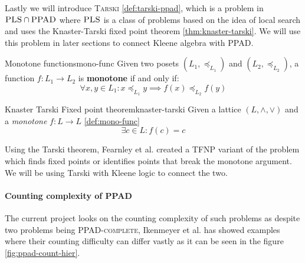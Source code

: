 Lastly we will introduce \textsc{Tarski} \ref{def:tarski-ppad}, which is a problem in $\textsc{PLS} \cap \textsc{PPAD}$
where $\textsc{PLS}$ is a class of problems based on the idea of local search \cite{johnson_HowEasyLocal_1988}
and uses the Knaster-Tarski fixed point theorem \ref{thm:knaster-tarski}. We will use this problem in later
sections to connect Kleene algebra with \textsc{PPAD}.


\begin{definitionbox}{Monotone functions}{mono-func}
    Given two posets $(L_1, \preceq_{L_1})$ and $(L_2, \preceq_{L_2})$, a function
    $f: L_1 \to L_2$ is \textbf{monotone} if and only if:
    $$
    \forall x,y \in L_1: x \preceq_{L_1} y \implies f(x) \preceq_{L_2} f(y)
    $$
\end{definitionbox}
    

\begin{theorembox}{Knaster Tarski Fixed point theorem\cite{bronislaw_TheoremeFunctionsDensembles_1928, fearnley_FasterAlgorithmFinding_2022}}{knaster-tarski}
    Given a lattice $(L, \wedge, \vee)$ and a \textit{monotone} $f: L \to L$ \ref{def:mono-func}
    $$
    \exists c \in L: f(c) = c
    $$
\end{theorembox}

Using the Tarski theorem, Fearnley et al. \cite{fearnley_FasterAlgorithmFinding_2022}
created a \textsc{TFNP} variant of the problem which finds fixed points or 
identifies points that break the monotone argument. We will be using Tarski 
with Kleene logic to connect the two.
%
\paragraph{Counting complexity of PPAD}

The current project looks on the counting complexity of such problems as despite two problems
being \textsc{PPAD-complete}, Ikenmeyer et al. \cite{pak_WhatCombinatorialInterpretation_2022} has showed examples where
their counting difficulty can differ vastly as it can be seen in the figure \ref{fig:ppad-count-hier}.

